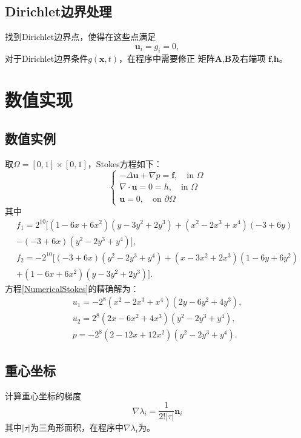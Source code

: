 \documentclass{ctexart}
\begin{document}
\subsection{Dirichlet边界处理}
找到Dirichlet边界点，使得在这些点满足
$$
\mathbf{u}_i= g_i=0,
$$
对于Dirichlet边界条件$g(\mathbf{x},t)$，在程序中需要修正
矩阵$\mathbf{A}$,$\mathbf{B}$及右端项
$\mathbf{f}$,$\mathbf{h}$。

\section{数值实现}

\subsection{数值实例}
取$\Omega = [0,1]\times [0, 1]$，Stokes方程如下：
\begin{equation}
    \label{NumericalStokes}
    \left\{\begin{matrix}
        - \Delta \mathbf{u}  + \nabla p = \mathbf{f}, \quad \text{in } \Omega\\ 
        \nabla \cdot \mathbf{u} = 0 = h, \quad \text{in } \Omega \\
        \mathbf{u} = 0, \quad \text{on } \partial \Omega
    \end{matrix}\right.
\end{equation}
其中
\begin{gather*}
    f_1 = 2^{10}[(1-6x+6x^2)(y-3y^2+2y^3)+(x^2-2x^3+x^4)(-3+6y)\\
    -(-3+6x)(y^2-2y^3+y^4)],\\
    f_2 = -2^{10}[(-3+6x)(y^2-2y^3+y^4)+(x-3x^2+2x^3)(1-6y+6y^2)\\
    +(1-6x+6x^2)(y-3y^2+2y^3)].
\end{gather*}
方程\ref{NumericalStokes}的精确解为：
\begin{gather*}
    u_1 = -2^8(x^2-2x^3+x^4)(2y-6y^2+4y^3),\\
    u_2 = 2^8(2x-6x^2+4x^3)(y^2-2y^3+y^4),\\
    p = -2^8(2-12x+12x^2)(y^2-2y^3+y^4).
\end{gather*}
\subsection{重心坐标}
计算重心坐标的梯度\cite{FEMCode}
\begin{equation}
    \nabla \lambda_i = \frac{1}{2!|\tau|} \mathbf{n}_i
\end{equation}
其中$|\tau|$为三角形面积，在程序中$\nabla \lambda_i$为。
\end{document}
